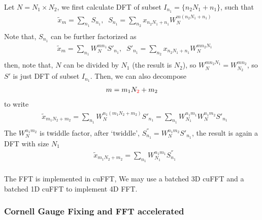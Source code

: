Let $N=N_1\times N_2$, we first calculate DFT of subset $I_{n_1}=\{n_2N_1+n_1\}$, such that
\begin{equation}
\begin{split}
&\tilde{x}_m=\sum _{n_1} S_{n_1},\;\;S_{n_1}=\sum _{n_2}x_{n_2N_1+n_1}W_N^{m(n_2N_1+n_1)}\\
\end{split}
\end{equation}
Note that, $S_{n_1}$ can be further factorized as
\begin{equation}
\begin{split}
&\tilde{x}_m=\sum _{n_1} W_N^{mn_1}S'_{n_1},\;\;S'_{n_1}=\sum _{n_2}x_{n_2N_1+n_1}W_N^{mn_2N_1}\\
\end{split}
\end{equation}
then, note that, $N$ can be divided by $N_1$ (the result is $N_2$), so $W_N^{mn_2N_1}=W_{N_2}^{mn_2}$, so $S'$ is just DFT of subset $I_{n_1}$. Then, we can also decompose
\begin{equation}
\begin{split}
&m=m_1N_{\textcolor[rgb]{1,0,0}{2}}+m_2\\
\end{split}
\end{equation}
to write
\begin{equation}
\begin{split}
&\tilde{x}_{m_1N_2+m_2}=\sum _{n_1} W_N^{n_1(m_1N_2+m_2)}S'_{n_1}=\sum _{n_1} W_{N_1}^{n_1m_1}W_N^{n_1m_2}S'_{n_1}\\
\end{split}
\end{equation}
The $W_N^{n_1m_2}$ is twiddle factor, after `twiddle', $S^{''}_{n_1}=W_N^{n_1m_2}S'_{n_1}$, the result is again a DFT with size $N_1$
\begin{equation}
\begin{split}
&\tilde{x}_{m_1N_2+m_2}=\sum _{n_1} W_{N_1}^{n_1m_1}S^{''}_{n_1}\\
\end{split}
\end{equation}

The FFT is implemented in cuFFT, \textcolor[rgb]{0,0,1}{We may use a batched 3D cuFFT and a batched 1D cuFFT to implement 4D FFT.}

\subsubsection{\label{sec:CornellGaugeFixing}Cornell Gauge Fixing and FFT accelerated}

